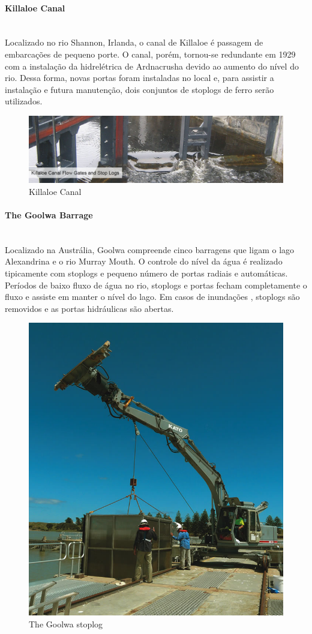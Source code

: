 \paragraph{Killaloe Canal}\mbox{}\\
Localizado no rio Shannon, Irlanda, o canal de Killaloe é passagem de embarcações de pequeno porte. O canal, porém, tornou-se redundante em 1929 com a instalação da hidrelétrica de Ardnacrusha devido ao aumento do nível do rio. Dessa forma, novas portas foram instaladas no local e, para assistir a instalação e futura manutenção, dois conjuntos de stoplogs de ferro serão utilizados.

\begin{figure}[H]
    \centering
    \includegraphics[width=1\columnwidth]{figs/pesqbib/4.jpg}
    \caption{Killaloe Canal}
    \label{pesqbib_4}
\end{figure}   

\paragraph{The Goolwa Barrage}\mbox{}\\
Localizado na Austrália, Goolwa compreende cinco barragens que ligam o lago Alexandrina e o rio Murray Mouth. O controle do nível da água é realizado tipicamente com stoplogs e pequeno número de portas radiais e automáticas. 
Períodos de baixo fluxo de água no rio, stoplogs e portas fecham completamente o fluxo e assiste em manter o nível do lago. Em casos de inundações , stoplogs são removidos e as portas hidráulicas são abertas.
 
\begin{figure}[H]
    \centering
    \includegraphics[width=0.5\columnwidth]{figs/pesqbib/5.jpg}
    \caption{The Goolwa stoplog}
    \label{pesqbib_5}
\end{figure}

